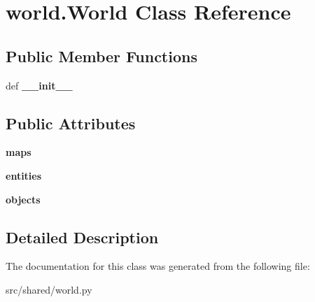 \hypertarget{classworld_1_1_world}{\section{world.\-World \-Class \-Reference}
\label{classworld_1_1_world}
}
\subsection*{\-Public \-Member \-Functions}
\begin{DoxyCompactItemize}
\item 
\hypertarget{classworld_1_1_world_a4351253668240be9d3a0d5bc2f1aa18f}{def {\bfseries \-\_\-\-\_\-init\-\_\-\-\_\-}}\label{classworld_1_1_world_a4351253668240be9d3a0d5bc2f1aa18f}

\end{DoxyCompactItemize}
\subsection*{\-Public \-Attributes}
\begin{DoxyCompactItemize}
\item 
\hypertarget{classworld_1_1_world_ae5d81046b959889536deca60b2df94a4}{{\bfseries maps}}\label{classworld_1_1_world_ae5d81046b959889536deca60b2df94a4}

\item 
\hypertarget{classworld_1_1_world_ae2c39feccf4fcd06f11f8398e42505a4}{{\bfseries entities}}\label{classworld_1_1_world_ae2c39feccf4fcd06f11f8398e42505a4}

\item 
\hypertarget{classworld_1_1_world_a144e6d2a815857b12be4cd2bf4ac2c44}{{\bfseries objects}}\label{classworld_1_1_world_a144e6d2a815857b12be4cd2bf4ac2c44}

\end{DoxyCompactItemize}


\subsection{\-Detailed \-Description}
\begin{DoxyVerb}\end{DoxyVerb}
 

\-The documentation for this class was generated from the following file\-:\begin{DoxyCompactItemize}
\item 
src/shared/world.\-py\end{DoxyCompactItemize}
